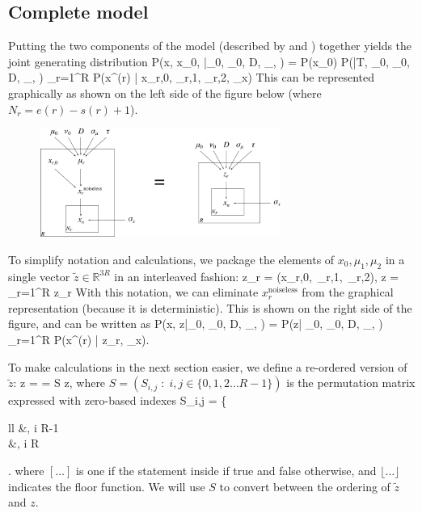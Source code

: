 \subsection{Complete model}
Putting the two components of the model (described by  and ) together yields the joint generating distribution
\bel
	P(x, x_0, \mu\;|\;\mu_0, \nu_0, D, \sigma_\mu, \tau) = P(x_0)\; P\Big(\mu\;\Big|\;T, \mu_0, \nu_0, D, \sigma_\mu, \tau\Big) \prod_{r=1}^R P\Big(x^{(r)} \;\Big|\; x_{r,0}, \mu_{r,1}, \mu_{r,2}, \sigma_x\Big)
\eel
This can be represented graphically as shown on the left side of the figure below (where $N_r = e(r) - s(r) + 1$).
\begin{figure}[h]
	\centering
	\includegraphics[width=0.7\textwidth]{./figs/graphical_model.pdf}
\end{figure}

To simplify notation and calculations, we package the elements of $x_0, \mu_1, \mu_2$ in a single vector $\tilde z\in \mathds{R}^{3R}$ in an interleaved fashion:
\be
	z_r = (x_{r,0}, \,\mu_{r,1}, \,\mu_{r,2})\quad, \qquad \tilde z = \bigoplus_{r=1}^R z_r
\ee
With this notation, we can eliminate $x_r^\text{noiseless}$ from the graphical representation (because it is deterministic). This is shown on the right side of the figure, and can be written as
\be
	P(x, \tilde z\;|\;\mu_0, \nu_0, D, \sigma_\mu, \tau) = P\Big(\tilde z\;\Big|\; \mu_0, \nu_0, D, \sigma_\mu, \tau\Big) \prod_{r=1}^R P\Big(x^{(r)} \;\Big|\; z_r, \sigma_x\Big)\quad .
\ee

To make calculations in the next section easier, we define a re-ordered version of $\tilde z$:
\be
	z =  \left[\bigoplus_{r=1}^R x_{r,0}\right]\oplus \left[\bigoplus_{r=1}^R (\mu_{r,1}, \mu_{r,2})\right] = S \tilde z\quad ,
\ee
where $S = (S_{i,j}\;:\; i,j\in\{0,1,2\ldots R-1\})$ is the permutation matrix expressed with zero-based indexes
\ba
	S_{i,j} = \left\{
	\begin{array}{ll}
		\big[j = 3i\big] &, \quad {}\quad i \leq R-1 \\
		\big[j = i - R + 1 + \lfloor (i-R)/2\rfloor\big] &, \quad {}\quad i \geq R
	\end{array}
	\right.
\ea
where $[\ldots]$ is one if the statement inside if true and false otherwise, and $\lfloor \ldots \rfloor$ indicates the floor function.
We will use $S$ to convert between the ordering of $\tilde z$ and $z$.


